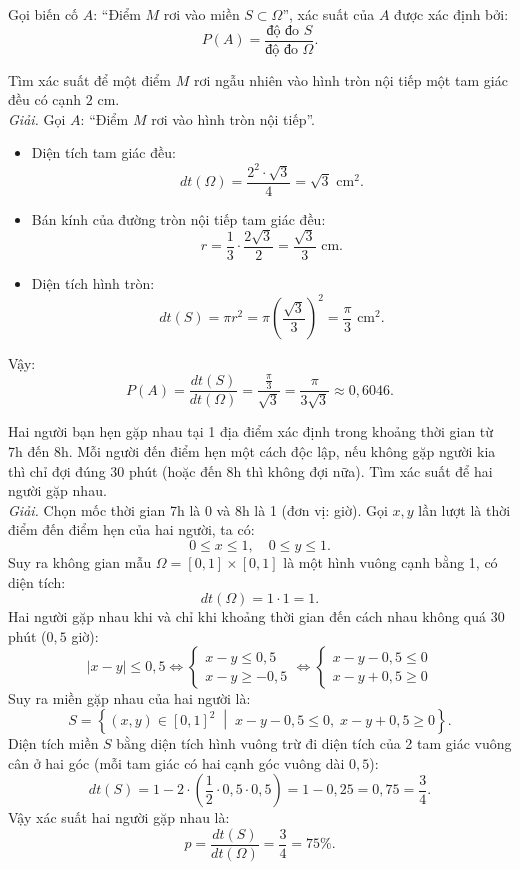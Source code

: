 Gọi biến cố $A$: ``Điểm $M$ rơi vào miền $S \subset \Omega$'', xác suất của $A$ được xác định bởi:
\[
P(A) = \frac{\text{độ đo } S}{\text{độ đo } \Omega}.
\]

\begin{vidu}
Tìm xác suất để một điểm $M$ rơi ngẫu nhiên vào hình tròn nội tiếp một tam giác đều có cạnh $2\text{ cm}$.\\
\textit{Giải.} Gọi $A$: ``Điểm $M$ rơi vào hình tròn nội tiếp''.
\begin{itemize}
    \item Diện tích tam giác đều:
    \[
    dt(\Omega) = \frac{2^2 \cdot \sqrt{3}}{4} = \sqrt{3}\text{ cm}^2.
    \]
    \item Bán kính của đường tròn nội tiếp tam giác đều:
    \[
    r = \frac{1}{3} \cdot \frac{2\sqrt{3}}{2} = \frac{\sqrt{3}}{3}\text{ cm}.
    \]
    \item Diện tích hình tròn:
    \[
    dt(S) = \pi r^2 = \pi \left(\frac{\sqrt{3}}{3}\right)^2 = \frac{\pi}{3}\text{ cm}^2.
    \]
\end{itemize}
Vậy:
\[
P(A) = \frac{dt(S)}{dt(\Omega)} = \frac{\frac{\pi}{3}}{\sqrt{3}} = \frac{\pi}{3\sqrt{3}} \approx 0{,}6046.
\]
\end{vidu}

\begin{vidu}
Hai người bạn hẹn gặp nhau tại 1 địa điểm xác định trong khoảng thời gian từ 7h đến 8h. Mỗi người đến điểm hẹn một cách độc lập, nếu không gặp người kia thì chỉ đợi đúng 30 phút (hoặc đến 8h thì không đợi nữa). Tìm xác suất để hai người gặp nhau.\\
\textit{Giải.}
Chọn mốc thời gian 7h là 0 và 8h là 1 (đơn vị: giờ).
Gọi $x, y$ lần lượt là thời điểm đến điểm hẹn của hai người, ta có:
\[
0 \le x \le 1, \quad 0 \le y \le 1.
\]
Suy ra không gian mẫu $\Omega = [0, 1] \times [0, 1]$ là một hình vuông cạnh bằng 1, có diện tích:
\[
dt(\Omega) = 1 \cdot 1 = 1.
\]
Hai người gặp nhau khi và chỉ khi khoảng thời gian đến cách nhau không quá 30 phút ($0{,}5$ giờ):
\[
|x - y| \le 0{,}5 \iff \begin{cases}
x - y \le 0{,}5 \\
x - y \ge -0{,}5
\end{cases} \iff \begin{cases}
x - y - 0{,}5 \le 0 \\
x - y + 0{,}5 \ge 0
\end{cases}
\]
Suy ra miền gặp nhau của hai người là:
\[
S = \left\{(x, y) \in [0, 1]^2 \;\middle|\; x - y - 0{,}5 \le 0, \; x - y + 0{,}5 \ge 0\right\}.
\]
Diện tích miền $S$ bằng diện tích hình vuông trừ đi diện tích của 2 tam giác vuông cân ở hai góc (mỗi tam giác có hai cạnh góc vuông dài $0{,}5$):
\[
dt(S) = 1 - 2 \cdot \left(\frac{1}{2} \cdot 0{,}5 \cdot 0{,}5\right) = 1 - 0{,}25 = 0{,}75 = \frac{3}{4}.
\]
Vậy xác suất hai người gặp nhau là:
\[
p = \frac{dt(S)}{dt(\Omega)} = \frac{3}{4} = 75\%.
\]
\end{vidu}

